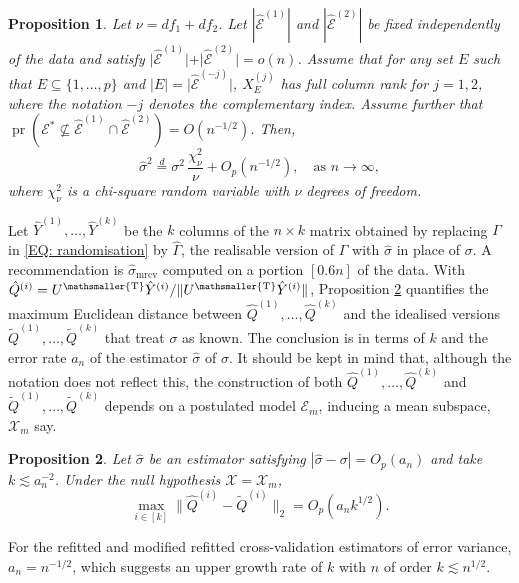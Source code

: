 \documentclass[10pt, reqno]{amsart}
\newtheorem{proposition}{Proposition}[section]
\numberwithin{equation}{section}
\newcommand{\pr}{\mathop{\mathrm{pr}}}
\newcommand{\T}{{\mathsmaller {\rm T}}}
\begin{document}
\begin{proposition}\label{propMRCV}
	Let $\nu = df_1 + df_2$. Let $|\hat{\mathcal{E}}^{(1)}|$ and $|\hat{\mathcal{E}}^{(2)}|$ be fixed independently of the data and satisfy $\vert\hat{\mathcal{E}}^{(1)} \vert + \vert\hat{\mathcal{E}}^{(2)} \vert= o(n)$. Assume that for any set $E$ such that $E\subseteq \{1, \ldots, p\}$ and $\vert E\vert =  \vert\hat{\mathcal{E}}^{(-j)} \vert$, $X^{(j)}_{E}$ has full column rank for $j = 1, 2$, where the notation $-j$ denotes the complementary index. Assume further that $
	\pr(\mathcal{E}^*\not\subseteq \hat{\mathcal{E}}^{(1)} \cap \hat{\mathcal{E}}^{(2)}) = O(n^{-1/2})$. Then,
	\[
	\hat{\sigma}^2
	\stackrel{d}{=}
	\sigma^2\,\frac{\chi^2_{\nu}}{\nu}
	+
	O_p( n^{-1/2}), \quad \text{as } n\to\infty,
	\]
	where $\chi^2_{\nu}$ is a chi-square random variable with $\nu$ degrees of freedom.
	
\end{proposition}

Let $\hat{Y}^{(1)}, \ldots, \hat{Y}^{(k)}$ be the $k$ columns of the $n\times k$ matrix obtained by replacing $\Gamma$ in \eqref{EQ: randomisation} by $\hat\Gamma$, the realisable version of $\Gamma$ with $\hat\sigma$ in place of $\sigma$. A recommendation is $\hat\sigma_{\text{mrcv}}$ computed on a portion $[0.6n]$ of the data. With $\hat Q^{(i)}=U^\T\hat Y^{(i)}/\|U^\T\hat Y^{(i)}\|$, Proposition \ref{thmQ} quantifies the maximum Euclidean distance between $\hat Q^{(1)},\ldots, \hat Q^{(k)}$ and the idealised versions $ \tilde Q^{(1)},\ldots, \tilde Q^{(k)}$ that treat $\sigma$ as known. The conclusion is in terms of $k$ and the error rate $a_n$ of the estimator $\hat\sigma$ of $\sigma$. It should be kept in mind that, although the notation does not reflect this, the construction of both $\hat Q^{(1)},\ldots, \hat Q^{(k)}$ and $\tilde Q^{(1)},\ldots, \tilde Q^{(k)}$ depends on a postulated model $\mathcal{E}_m$, inducing a mean subspace, $\mathcal{X}_m$ say. 

\begin{proposition}\label{thmQ}
	Let $\hat\sigma$ be an estimator satisfying $|\hat\sigma - \sigma| = O_p(a_n)$ and take $k\lesssim a_n^{-2}$. Under the null hypothesis $\mathcal{X}=\mathcal{X}_m$,
	\[ 
	\max_{i \in [k]}\|\hat Q^{(i)} - \tilde Q^{(i)}\|_{2}= O_p(a_n k^{1/2}). 
	\]
\end{proposition}

For the refitted and modified refitted cross-validation estimators of error variance, $a_n=n^{-1/2}$, which suggests an upper growth rate of $k$ with $n$ of order $k\lesssim n^{1/2}$.
\end{document}
